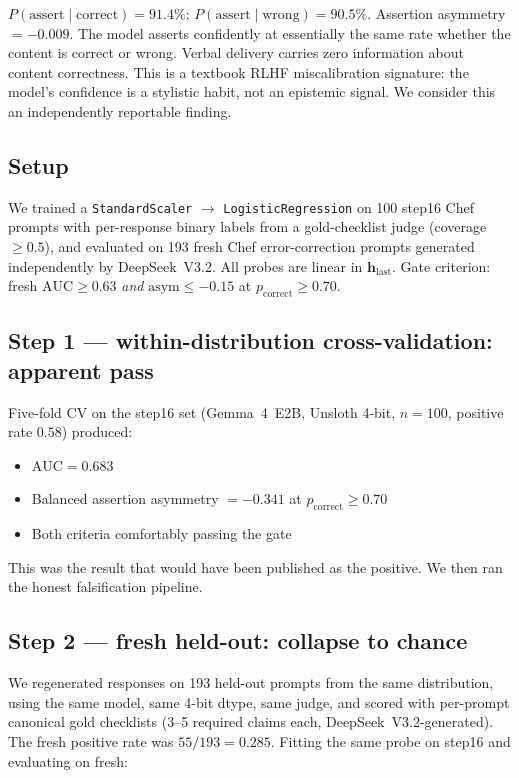 \documentclass[11pt,a4paper]{article}
\begin{document}
$P(\text{assert} \mid \text{correct}) = 91.4\%$; $P(\text{assert} \mid \text{wrong}) = 90.5\%$. Assertion asymmetry $= -0.009$. The model asserts confidently at essentially the same rate whether the content is correct or wrong. Verbal delivery carries zero information about content correctness. This is a textbook RLHF miscalibration signature: the model's confidence is a stylistic habit, not an epistemic signal. We consider this an independently reportable finding.

\subsection{Setup}

We trained a \texttt{StandardScaler} $\to$ \texttt{LogisticRegression} on 100 step16 Chef prompts with per-response binary labels from a gold-checklist judge (coverage $\geq 0.5$), and evaluated on 193 fresh Chef error-correction prompts generated independently by DeepSeek~V3.2. All probes are linear in $\mathbf{h}_{\text{last}}$. Gate criterion: fresh $\text{AUC} \geq 0.63$ \emph{and} $\text{asym} \leq -0.15$ at $p_{\text{correct}} \geq 0.70$.

\subsection{Step 1 --- within-distribution cross-validation: apparent pass}

Five-fold CV on the step16 set (Gemma~4~E2B, Unsloth 4-bit, $n{=}100$, positive rate $0.58$) produced:

\begin{itemize}[leftmargin=*]
\item $\text{AUC} = 0.683$
\item Balanced assertion asymmetry $= -0.341$ at $p_{\text{correct}} \geq 0.70$
\item Both criteria comfortably passing the gate
\end{itemize}

This was the result that would have been published as the positive. We then ran the honest falsification pipeline.

\subsection{Step 2 --- fresh held-out: collapse to chance}

We regenerated responses on 193 held-out prompts from the same distribution, using the same model, same 4-bit dtype, same judge, and scored with per-prompt canonical gold checklists (3--5 required claims each, DeepSeek~V3.2-generated). The fresh positive rate was $55/193 = 0.285$. Fitting the same probe on step16 and evaluating on fresh:
\end{document}
